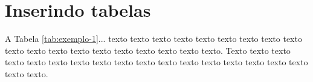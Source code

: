 \section{Inserindo tabelas}\label{sec:tabelas}
    
    A Tabela \ref{tab:exemplo-1}... texto texto texto texto texto texto texto texto texto texto texto texto texto texto texto texto texto texto texto. Texto texto texto texto texto texto texto texto texto texto texto texto texto texto texto texto texto texto texto.
	
	\begin{table}[!h]
	\captionsetup{width=7cm}%
	\caption{\label{tab:exemplo-1} Um Exemplo de tabela alinhada que pode ser longa ou curta}%
    \end{table}


